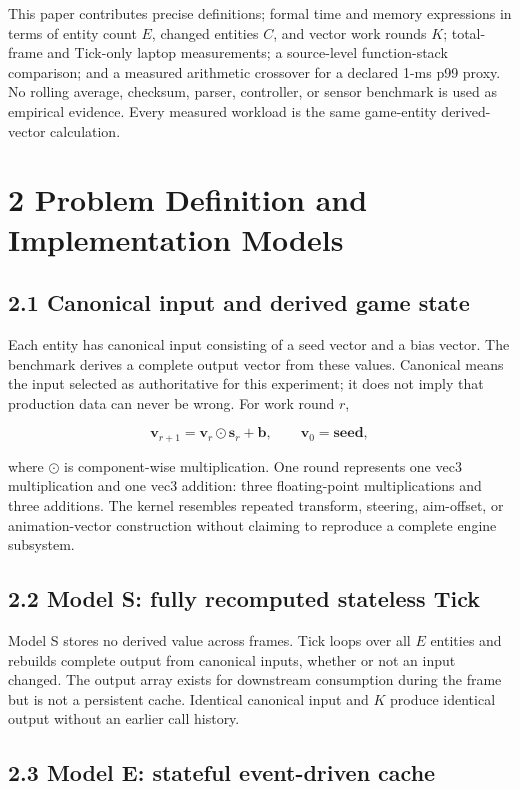 This paper contributes precise definitions; formal time and memory expressions in terms of entity count \(E\), changed entities \(C\), and vector work rounds \(K\); total-frame and Tick-only laptop measurements; a source-level function-stack comparison; and a measured arithmetic crossover for a declared 1-ms p99 proxy. No rolling average, checksum, parser, controller, or sensor benchmark is used as empirical evidence. Every measured workload is the same game-entity derived-vector calculation.

\section{2 Problem Definition and Implementation Models}

\subsection{2.1 Canonical input and derived game state}

Each entity has canonical input consisting of a seed vector and a bias vector. The benchmark derives a complete output vector from these values. Canonical means the input selected as authoritative for this experiment; it does not imply that production data can never be wrong. For work round \(r\),

\[
\mathbf{v}_{r+1} = \mathbf{v}_{r} \odot \mathbf{s}_{r} + \mathbf{b},
\qquad \mathbf{v}_0=\mathbf{seed},
\]

where \(\odot\) is component-wise multiplication. One round represents one vec3 multiplication and one vec3 addition: three floating-point multiplications and three additions. The kernel resembles repeated transform, steering, aim-offset, or animation-vector construction without claiming to reproduce a complete engine subsystem.

\subsection{2.2 Model S: fully recomputed stateless Tick}

Model S stores no derived value across frames. Tick loops over all \(E\) entities and rebuilds complete output from canonical inputs, whether or not an input changed. The output array exists for downstream consumption during the frame but is not a persistent cache. Identical canonical input and \(K\) produce identical output without an earlier call history.

\subsection{2.3 Model E: stateful event-driven cache}

